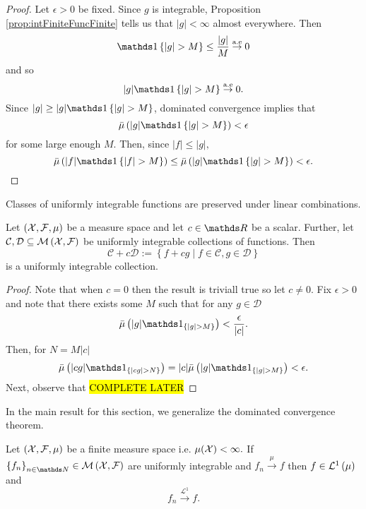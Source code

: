 \begin{proof}
Let $\epsilon>0$ be fixed. Since $g$ is integrable, Proposition
\ref{prop:intFiniteFuncFinite} tells us that $\lvert g\rvert<\infty$
almost everywhere. Then
\[
\indicate\left\{ \lvert g\rvert>M\right\} \leq\frac{\lvert g\rvert}{M}\stackrel{\text{a.e}}{\to}0
\]
and so 
\[
\lvert g\rvert\indicate\left\{ \rvert g\rvert>M\right\} \stackrel{\text{a.e}}{\to}0.
\]
Since $\lvert g\rvert\geq\lvert g\rvert\indicate\left\{ \rvert g\rvert>M\right\} $,
dominated convergence implies that 
\[
\lebInt{\mu}{\lvert g\rvert\indicate\left\{ \lvert g\rvert>M\right\} }<\epsilon
\]
for some large enough $M.$ Then, since $\lvert f\rvert\leq\lvert g\rvert,$
\[
\lebInt{\mu}{\lvert f\rvert\indicate\left\{ \lvert f\rvert>M\right\} }\leq\lebInt{\mu}{\lvert g\rvert\indicate\left\{ \lvert g\rvert>M\right\} }<\epsilon.
\]
\end{proof}
Classes of uniformly integrable functions are preserved under linear
combinations.
\begin{prop}
\label{prop:uniformlyIntegrableLinearCombination}Let $\left(\mathcal{X},\mathcal{F},\mu\right)$
be a measure space and let $c\in\R$ be a scalar. Further, let $\mathcal{C},\mathcal{D}\subseteq\mathcal{M}\left(\mathcal{X},\mathcal{F}\right)$
be uniformly integrable collections of functions. Then 
\[
\mathcal{C}+c\mathcal{D}:=\left\{ f+cg\mid f\in\mathcal{C},g\in\mathcal{D}\right\} 
\]
is a uniformly integrable collection.
\end{prop}

\begin{proof}
Note that when $c=0$ then the result is triviall true so let $c\neq0.$
Fix $\epsilon>0$ and note that there exists some $M$ such that for
any $g\in\mathcal{D}$
\[
\lebInt{\mu}{\lvert g\rvert\indicate_{\{\lvert g\rvert>M\}}}<\frac{\epsilon}{\lvert c\rvert}.
\]
Then, for $N=M\lvert c\rvert$
\[
\lebInt{\mu}{\lvert cg\rvert\indicate_{\{\lvert cg\rvert>N\}}}=\lvert c\rvert\lebInt{\mu}{\lvert g\rvert\indicate_{\{\lvert g\rvert>M\}}}<\epsilon.
\]
Next, observe that \hl{COMPLETE LATER}
\end{proof}
In the main result for this section, we generalize the dominated convergence
theorem.
\begin{thm}
\label{thm:vitaliConvergence}Let $\left(\mathcal{X},\mathcal{F},\mu\right)$ be a
finite measure space i.e. $\mu(\mathcal{X})<\infty.$ If $\left\{ f_{n}\right\} _{n\in\N}\in\measurableFunctions$
are uniformly integrable and $f_{n}\stackrel{\mu}{\longrightarrow}f$
then $f\in\mathcal{L}^{1}\left(\mu\right)$ and 
\[
f_{n}\stackrel{\mathcal{L}^{1}}{\longrightarrow}f.
\]
\end{thm}

